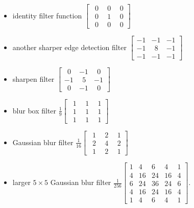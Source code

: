 \documentclass[4apaper,12pt]{book}
\begin{document}
\begin{description}
\begin{description}
\begin{itemize}
      \item identity filter function $\begin{bmatrix}
        \ \ 0 &\ \  0 &\ \  0 \\
        \ \ 0 &\ \  1 &\ \  0 \\
        \ \ 0 &\ \  0 &\ \  0 \end{bmatrix}$
      \item  another sharper edge detection filter $\begin{bmatrix}
        -1 &  -1 & -1 \\
        -1 & \ \ 8 & -1 \\
        -1 &  -1 & -1 \end{bmatrix}$
      \item sharpen filter $\begin{bmatrix}
        \ \ 0 & -1 & \ \ 0 \\
        -1 & \ \ 5 & -1 \\
        \ \ 0 & -1 & \ \ 0
      \end{bmatrix} $
      \item blur box filter $\frac{1}{9}
        \begin{bmatrix}
          \ \ 1 &\ \  1 &\ \  1 \\
          \ \ 1 &\ \  1 &\ \  1 \\
          \ \ 1 &\ \  1 &\ \  1
        \end{bmatrix}$
      \item Gaussian blur filter $\frac{1}{16}
        \begin{bmatrix}
          \ \ 1 &\ \  2 &\ \  1 \\
          \ \ 2 &\ \  4 &\ \  2 \\
          \ \ 1 &\ \  2 &\ \  1
        \end{bmatrix}$
      \item larger $5\times5$ Gaussian blur filter $\frac{1}{256} \begin{bmatrix}
        1 & 4 & 6 & 4 & 1 \\
        4 & 16 & 24 & 16 & 4 \\
        6 & 24 & 36 & 24 & 6 \\
        4 & 16 & 24 & 16 & 4 \\
        1 & 4 & 6 & 4 & 1
      \end{bmatrix}$.
      \end{itemize}

\end{description}
\end{description}
\end{document}
